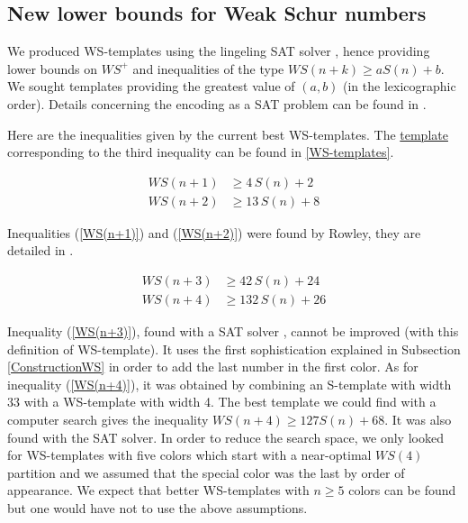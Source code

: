 \documentclass{article}
\newtheorem{computational theorem}[definition]{Computational Theorem}
\newcommand{\WS}{\mathit{WS}}
\begin{document}
\subsection{New lower bounds for Weak Schur numbers}

We produced WS-templates using the lingeling SAT solver \cite{Lingeling2017}, hence providing lower bounds on \(WS^+\) 
and inequalities of the type \(WS(n+k) \geqslant a S(n) + b\). We sought templates providing the greatest value of \((a, b)\) 
(in the lexicographic order). Details concerning the encoding as a SAT problem can be found in \cite{Heule2017}.

\par
Here are the inequalities given by the current best WS-templates. The \hyperref[WS-templates]{template} 
corresponding to the third inequality can be found in \ref{WS-templates}.

\begin{align}
	WS(n + 1) &\geqslant  4\,S(n)  +  2 \label{WS(n+1)} \\
	WS(n + 2) &\geqslant  13\,S(n)  +  8 \label{WS(n+2)} 
\end{align}

Inequalities (\ref{WS(n+1)}) and (\ref{WS(n+2)}) were found by Rowley, they are detailed in \cite{RowleyWS}.

\begin{align}
	WS(n + 3) &\geqslant  42\,S(n)  +  24 \label{WS(n+3)} \\
	WS(n + 4) &\geqslant  132\,S(n)  +  26 \label{WS(n+4)}
\end{align}

Inequality (\ref{WS(n+3)}), found with a SAT solver \cite{Lingeling2017}, cannot be improved (with this 
definition of WS-template). It uses the first 
sophistication explained in Subsection \ref{ConstructionWS} in order to add
the last number in the first color. As for inequality (\ref{WS(n+4)}), it was obtained by combining an S-template with 
width 33 with a WS-template with width 4. The best template we could find with a computer search gives the 
inequality \(\WS(n+4) \geqslant 127 S(n) + 68\). It was also found with the SAT solver. In order to reduce the search space, 
we only looked for WS-templates with five colors which start with a near-optimal \(\WS(4)\) partition and we assumed that the 
special color was the last by order of appearance. We expect that better WS-templates with \(n \geqslant 5\) 
colors can be found but one would have not to use the above assumptions.
\end{document}
